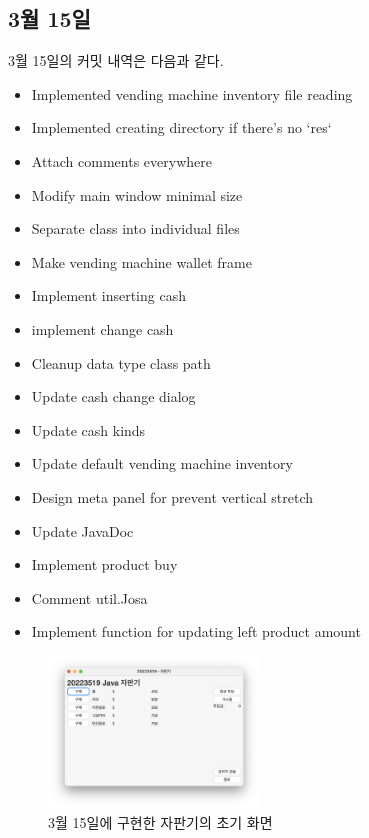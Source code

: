 \documentclass{oblivoir}
\begin{document}
    \subsection{3월 15일}

    3월 15일의 커밋 내역은 다음과 같다.
    \begin{itemize}
        \item Implemented vending machine inventory file reading
        \item Implemented creating directory if there's no `res`
        \item Attach comments everywhere
        \item Modify main window minimal size
        \item Separate class into individual files
        \item Make vending machine wallet frame
        \item Implement inserting cash
        \item implement change cash
        \item Cleanup data type class path
        \item Update cash change dialog
        \item Update cash kinds
        \item Update default vending machine inventory
        \item Design meta panel for prevent vertical stretch
        \item Update JavaDoc
        \item Implement product buy
        \item Comment util.Josa
        \item Implement function for updating left product amount
    \end{itemize}

    \begin{figure}[h]
        \centering
        \includegraphics[width=0.5\textwidth]{images/dev-snapshop/0315-vending-machine}
        \caption{3월 15일에 구현한 자판기의 초기 화면}
    \end{figure}
\end{document}
